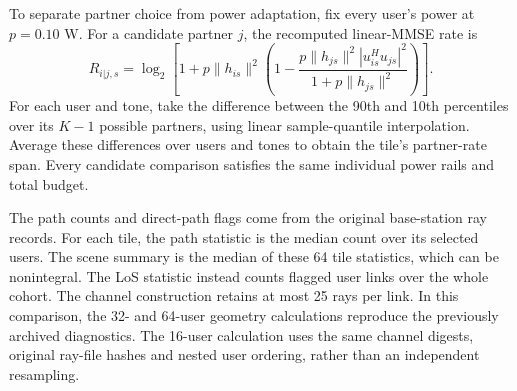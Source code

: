 \documentclass[10pt,letterpaper]{article}
\begin{document}
To separate partner choice from power adaptation, fix every user's power at \(p=0.10\) W. For a candidate partner \(j\), the recomputed linear-MMSE rate is
\begin{equation}
R_{i|j,s}=\log_2\left[1+p\|h_{is}\|^2
\left(1-\frac{p\|h_{js}\|^2|u_{is}^{H}u_{js}|^2}{1+p\|h_{js}\|^2}\right)\right].
\end{equation}
For each user and tone, take the difference between the 90th and 10th percentiles over its \(K-1\) possible partners, using linear sample-quantile interpolation. Average these differences over users and tones to obtain the tile's partner-rate span. Every candidate comparison satisfies the same individual power rails and total budget.

The path counts and direct-path flags come from the original base-station ray records. For each tile, the path statistic is the median count over its selected users. The scene summary is the median of these 64 tile statistics, which can be nonintegral. The LoS statistic instead counts flagged user links over the whole cohort. The channel construction retains at most 25 rays per link. In this comparison, the 32- and 64-user geometry calculations reproduce the previously archived diagnostics. The 16-user calculation uses the same channel digests, original ray-file hashes and nested user ordering, rather than an independent resampling.
\end{document}

